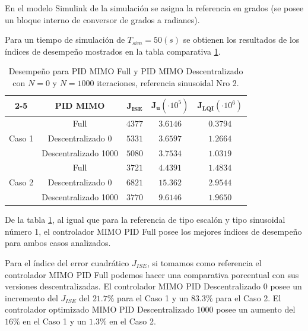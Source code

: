 \begin{remark}
    En el modelo Simulink de la simulación se asigna la referencia en grados (se posee un bloque interno de conversor de grados a radianes).
\end{remark}

Para un tiempo de simulación de $T_{sim}=50(s)$ se obtienen los resultados de los índices de desempeño mostrados en la tabla comparativa \ref{tab:indices_mimopid_sinusoidal_nro2}.

\begin{table}[ht]
\centering
\begin{tabular}{c|c|c|c|c|}
\cline{2-5}
    & \textbf{PID MIMO} & $\mathbf{J_{ISE}}$ & $\mathbf{J_{u}}(\cdot10^5)$ & $\mathbf{J_{LQI}}(\cdot10^6)$ \\ \hline
\multicolumn{1}{|c|}{\multirow{3}{*}{Caso 1}} &  Full               & $4377$ & $3.6146$ & $0.3794$ \\ \cline{2-5} 
\multicolumn{1}{|c|}{}                        & Descentralizado 0   & $5331$ & $3.6597$ & $1.2664$ \\ \cline{2-5} 
\multicolumn{1}{|c|}{}                        & Descentralizado 1000& $5080$ & $3.7534$ & $1.0319$ \\ \hline
\multicolumn{1}{|c|}{\multirow{3}{*}{Caso 2}} & Full                & $3721$ & $4.4391$ & $1.4834$ \\ \cline{2-5} 
\multicolumn{1}{|c|}{}                        & Descentralizado 0   & $6821$ & $15.362$ & $2.9544$ \\ \cline{2-5} 
\multicolumn{1}{|c|}{}                        & Descentralizado 1000& $3770$ & $9.6146$ & $1.9650$ \\ \hline
\end{tabular}
\caption{Desempeño para PID MIMO Full y PID MIMO Descentralizado con $N=0$ y $N=1000$ iteraciones, referencia sinusoidal Nro 2.}
\label{tab:indices_mimopid_sinusoidal_nro2}
\end{table}

De la tabla \ref{tab:indices_mimopid_sinusoidal_nro2}, al igual que para la referencia de tipo escalón y tipo sinusoidal número 1, el controlador MIMO PID Full posee los mejores índices de desempeño para ambos casos analizados. 

Para el índice del error cuadrático $J_{ISE}$, si tomamos como referencia el controlador MIMO PID Full podemos hacer una comparativa porcentual con sus versiones descentralizadas. El controlador MIMO PID Descentralizado 0 posee un incremento del $J_{ISE}$ del $21.7\%$ para el Caso 1 y un $83.3\%$ para el Caso 2. El controlador optimizado MIMO PID Descentralizado 1000 posee un aumento del $16\%$ en el Caso 1 y un $1.3\%$ en el Caso 2.

